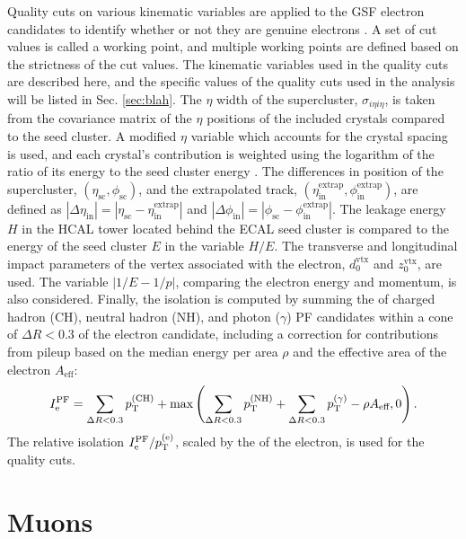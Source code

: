 \documentclass[12pt]{thesis}  %
\newcommand{\Pe}{\ensuremath{\cmsSymbolFace{e}}\xspace}
\begin{document}
Quality cuts on various kinematic variables are applied to the GSF electron candidates to identify whether or not they are genuine electrons \cite{ElectronCutBased}. A set of cut values is called a working point, and multiple working points are defined based on the strictness of the cut values. The kinematic variables used in the quality cuts are described here, and the specific values of the quality cuts used in the analysis will be listed in Sec. \ref{sec:blah}. The $\eta$ width of the supercluster, $\sigma_{i\eta i\eta}$, is taken from the covariance matrix of the $\eta$ positions of the included crystals compared to the seed cluster. A modified $\eta$ variable which accounts for the crystal spacing is used, and each crystal's contribution is weighted using the logarithm of the ratio of its energy to the seed cluster energy \cite{EgammaShowerShape}. The differences in position of the supercluster, $(\eta_{\text{sc}},\phi_{\text{sc}})$, and the extrapolated track, $(\eta_{\text{in}}^{\text{extrap}},\phi_{\text{in}}^{\text{extrap}})$, are defined as $|\Delta \eta_{\text{in}}| = |\eta_{\text{sc}} - \eta_{\text{in}}^{\text{extrap}}|$ and $|\Delta \phi_{\text{in}}| = |\phi_{\text{sc}} - \phi_{\text{in}}^{\text{extrap}}|$. The leakage energy $H$ in the HCAL tower located behind the ECAL seed cluster is compared to the energy of the seed cluster $E$ in the variable $H/E$. The transverse and longitudinal impact parameters of the vertex associated with the electron, $d_{0}^{\text{vtx}}$ and $z_{0}^{\text{vtx}}$, are used. The variable $|1/E - 1/p|$, comparing the electron energy and momentum, is also considered. Finally, the isolation is computed by summing the \pt of charged hadron (CH), neutral hadron (NH), and photon ($\gamma$) PF candidates within a cone of $\Delta R < 0.3$ of the electron candidate, including a correction for contributions from pileup based on the median energy per area $\rho$ and the effective area of the electron $A_{\text{eff}}$:
\begin{equation}
I^{\text{PF}}_{\Pe} = \sum_{\Delta R < 0.3}{\pt^{(\text{CH})}} + \text{max}\left( \sum_{\Delta R < 0.3}{\pt^{(\text{NH})}} + \sum_{\Delta R < 0.3}{\pt^{(\gamma)}} - \rho A_{\text{eff}}, 0 \right).
\end{equation}
The relative isolation $I^{\text{PF}}_{\Pe}/\pt^{(\Pe)}$, scaled by the \pt of the electron, is used for the quality cuts.

\section{Muons}
\end{document}
